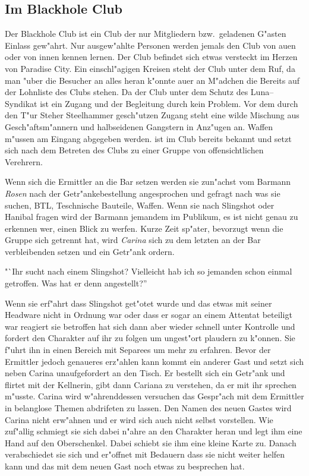 \subsection{Im Blackhole Club}

Der Blackhole Club ist ein Club der nur Mitgliedern bzw.~geladenen G"asten Einlass gew"ahrt. Nur ausgew"ahlte Personen werden jemals den Club von au\3en oder von innen kennen lernen. Der Club befindet sich etwas versteckt im Herzen von Paradise City. Ein einschl"agigen Kreisen steht der Club unter dem Ruf, da\3 man "uber die Besucher an alles heran k"onnte au\3er an M"adchen die Bereits auf der Lohnliste des Clubs stehen. Da der Club unter dem Schutz des Luna--Syndikat ist ein Zugang und der Begleitung durch \xl{} kein Problem. Vor dem durch den T"ur Steher Steelhammer gesch"utzen Zugang steht eine wilde Mischung aus Gesch"aftsm"annern und halbseidenen Gangstern in Anz"ugen an. Waffen m"ussen am Eingang abgegeben werden. \xl{} ist im Club bereits bekannt und setzt sich nach dem Betreten des Clubs zu einer Gruppe von offensichtlichen Verehrern.

Wenn sich die Ermittler an die Bar setzen werden sie zun"achst vom Barmann \emph{Rosen} nach der Getr"ankebestellung angesprochen und gefragt nach was sie suchen, BTL, Teschnische Bauteile, Waffen. Wenn sie nach Slingshot oder Hanibal fragen wird der Barmann jemandem im Publikum, es ist nicht genau zu erkennen wer, einen Blick zu werfen. Kurze Zeit sp"ater, bevorzugt wenn die Gruppe sich getrennt hat, wird \emph{Carina} sich zu dem letzten an der Bar verbleibenden setzen und ein Getr"ank ordern.

"`Ihr sucht nach einem Slingshot? Vielleicht hab ich so jemanden schon einmal getroffen. Was hat er denn angestellt?''

Wenn sie erf"ahrt dass Slingshot get"otet wurde und das etwas mit seiner Headware nicht in Ordnung war oder dass er sogar an einem Attentat beteiligt war reagiert sie betroffen hat sich dann aber wieder schnell unter Kontrolle und fordert den Charakter auf ihr zu folgen um ungest"ort plaudern zu k"onnen. Sie f"uhrt ihn in einen Bereich mit Separees um mehr zu erfahren. Bevor der Ermittler jedoch genaueres erz"ahlen kann kommt ein anderer Gast und setzt sich neben Carina unaufgefordert an den Tisch. Er bestellt sich ein Getr"ank und flirtet mit der Kellnerin, gibt dann Cariana zu verstehen, da\3 er mit ihr sprechen m"usste. Carina wird w"ahrenddessen versuchen das Gespr"ach mit dem Ermittler in belanglose Themen abdrifeten zu lassen. Den Namen des neuen Gastes wird Carina nicht erw"ahnen und er wird sich auch nicht selbst vorstellen. Wie zuf"allig schmiegt sie sich dabei n"ahre an den Charakter heran und legt ihm eine Hand auf den Oberschenkel. Dabei schiebt sie ihm eine kleine Karte zu. Danach verabschiedet sie sich und er"offnet mit Bedauern dass sie nicht weiter helfen kann und das mit dem neuen Gast noch etwas zu besprechen hat.

